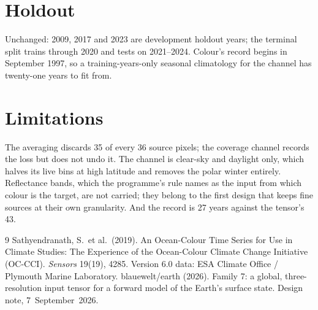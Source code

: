 \documentclass[10pt]{article}
\begin{document}
\section{Holdout}

Unchanged: 2009, 2017 and 2023 are development holdout years; the terminal
split trains through 2020 and tests on 2021--2024. Colour's record begins in
September 1997, so a training-years-only seasonal climatology for the channel
has twenty-one years to fit from.

\section{Limitations}

The averaging discards 35 of every 36 source pixels; the coverage channel
records the loss but does not undo it. The channel is clear-sky and daylight
only, which halves its live bins at high latitude and removes the polar
winter entirely. Reflectance bands, which the programme's rule names as the
input from which colour is the target, are not carried; they belong to the
first design that keeps fine sources at their own granularity. And the record
is 27 years against the tensor's 43.

\begin{thebibliography}{9}\small
{} Sathyendranath, S.\ et al.\ (2019). An Ocean-Colour Time
Series for Use in Climate Studies: The Experience of the Ocean-Colour Climate
Change Initiative (OC-CCI). \emph{Sensors} 19(19), 4285. Version 6.0 data:
ESA Climate Office / Plymouth Marine Laboratory.
 blauewelt/earth (2026). Family 7: a global, three-resolution
input tensor for a forward model of the Earth's surface state. Design note,
7~September~2026.
\end{thebibliography}
\end{document}
